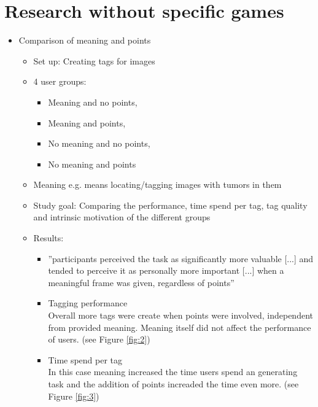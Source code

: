 \documentclass{article}
\theoremstyle{definition}
\theoremstyle{remark}
\begin{document}
\section{Research without specific games}
\begin{itemize} 
    \item Comparison of meaning and points \cite{disassembling_gamification}
    \begin{itemize}
        \item Set up: Creating tags for images
        \item 4 user groups: 
        \begin{itemize}
            \item Meaning and no points,
            \item Meaning and points,
            \item No meaning and no points,
            \item No meaning and points
        \end{itemize}
        \item Meaning e.g. means locating/tagging images with tumors in them
        \item Study goal: Comparing the performance, time spend per tag, tag quality and intrinsic motivation of the different groups
        \item Results:
        \begin{itemize}
            \item ''participants perceived the task as significantly more valuable [...] and tended to perceive it as personally more important [...] when a meaningful frame was given, regardless of points'' \cite{disassembling_gamification}
            \item Tagging performance\\
            Overall more tags were create when points were involved, independent from provided meaning. Meaning itself did not affect the performance of users. (see Figure \ref{fig:2})
            \item Time spend per tag\\
            In this case meaning increased the time users spend an generating task and the addition of points increaded the time even more. (see Figure \ref{fig:3})
            \begin{figure}[ht!]
                \centering
                \begin{minipage}[b]{0.49\textwidth}

\end{minipage}
\end{figure}
\end{itemize}
\end{itemize}
\end{itemize}
\end{document}
